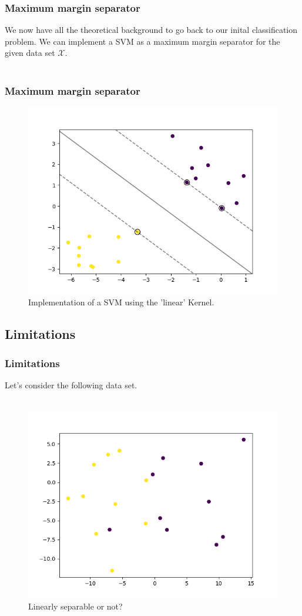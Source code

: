 \documentclass{beamer}
\begin{document}
\begin{frame}{}
    \frametitle{Maximum margin separator}
    We now have all the theoretical background to go back to our inital classification problem. We can implement a SVM as a maximum margin separator for the given data set $\mathcal{X}$. \\~\\  
\end{frame}


\begin{frame}{}
	\frametitle{Maximum margin separator}
	\begin{figure}
		\centering
		\includegraphics[width=0.7\linewidth]{img/LinearSVM_complete.png}
		\caption{Implementation of a SVM using the 'linear' Kernel.}
		\label{fig:linearsvm}
	\end{figure}
	 
\end{frame}


\subsection{Limitations}

\begin{frame}{}
	\frametitle{Limitations}
	Let's consider the following data set. \\~\\ 
	\begin{figure}
		\centering
		\includegraphics[width=0.65\linewidth]{img/SlackData}
		\caption{Linearly separable or not?}
		\label{fig:slackdata}
	\end{figure}
\end{frame}
\end{document}
